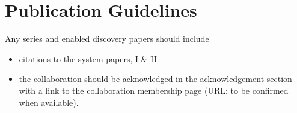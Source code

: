 \documentclass[a4paper]{article}
\begin{document}

\section{Publication Guidelines}
\label{sec:publ}
Any \sw series and \sw enabled discovery papers should include
\begin{itemize}
\item citations to the \sw system papers, \sw I \& II
\item the collaboration should be acknowledged in the acknowledgement section with a link to the collaboration membership page (URL: to be confirmed when available).
\end{itemize}


\end{document}
